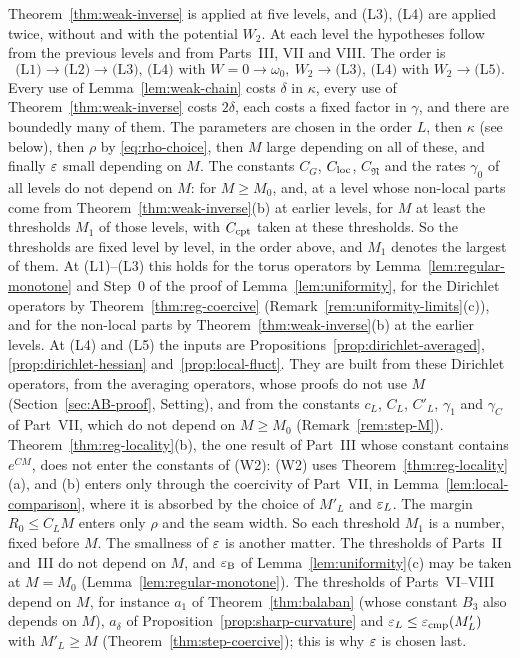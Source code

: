 Theorem~\ref{thm:weak-inverse} is applied at five levels, and (L3), (L4) are applied twice, without and with the potential $W_2$. At each level the hypotheses follow from the previous levels and from Parts~III, VII and VIII. The order is
\[
\text{(L1)}\to\text{(L2)}\to\text{(L3), (L4) with }W=0\to\omega_0,\ W_2\to\text{(L3), (L4) with }W_2\to\text{(L5)}.
\]
Every use of Lemma~\ref{lem:weak-chain} costs $\delta$ in $\kappa$, every use of Theorem~\ref{thm:weak-inverse} costs $2\delta$, each costs a fixed factor in $\gamma$, and there are boundedly many of them. The parameters are chosen in the order $L$, then $\kappa$ (see below), then $\rho$ by \eqref{eq:rho-choice}, then $M$ large depending on all of these, and finally $\varepsilon$ small depending on $M$. The constants $C_G$, $C_{\rm loc}$, $C_{\mathfrak N}$ and the rates $\gamma_0$ of all levels do not depend on $M$: for $M\ge M_0$, and, at a level whose non-local parts come from Theorem~\ref{thm:weak-inverse}(b) at earlier levels, for $M$ at least the thresholds $M_1$ of those levels, with $C_{\rm cpt}$ taken at these thresholds. So the thresholds are fixed level by level, in the order above, and $M_1$ denotes the largest of them. At (L1)--(L3) this holds for the torus operators by Lemma~\ref{lem:regular-monotone} and Step~0 of the proof of Lemma~\ref{lem:uniformity}, for the Dirichlet operators by Theorem~\ref{thm:reg-coercive} (Remark~\ref{rem:uniformity-limits}(c)), and for the non-local parts by Theorem~\ref{thm:weak-inverse}(b) at the earlier levels. At (L4) and (L5) the inputs are Propositions~\ref{prop:dirichlet-averaged}, \ref{prop:dirichlet-hessian} and~\ref{prop:local-fluct}. They are built from these Dirichlet operators, from the averaging operators, whose proofs do not use $M$ (Section~\ref{sec:AB-proof}, Setting), and from the constants $c_L$, $C_L$, $C'_L$, $\gamma_1$ and $\gamma_C$ of Part~VII, which do not depend on $M\ge M_0$ (Remark~\ref{rem:step-M}). Theorem~\ref{thm:reg-locality}(b), the one result of Part~III whose constant contains $e^{CM}$, does not enter the constants of (W2): (W2) uses Theorem~\ref{thm:reg-locality}(a), and (b) enters only through the coercivity of Part~VII, in Lemma~\ref{lem:local-comparison}, where it is absorbed by the choice of $M'_L$ and $\varepsilon_L$. The margin $R_0\le C_LM$ enters only $\rho$ and the seam width. So each threshold $M_1$ is a number, fixed before $M$. The smallness of $\varepsilon$ is another matter. The thresholds of Parts~II and~III do not depend on $M$, and $\varepsilon_{\rm B}$ of Lemma~\ref{lem:uniformity}(c) may be taken at $M=M_0$ (Lemma~\ref{lem:regular-monotone}). The thresholds of Parts~VI--VIII depend on $M$, for instance $a_1$ of Theorem~\ref{thm:balaban} (whose constant $B_3$ also depends on $M$), $a_\delta$ of Proposition~\ref{prop:sharp-curvature} and $\varepsilon_L\le\varepsilon_{\rm cmp}(M'_L)$ with $M'_L\ge M$ (Theorem~\ref{thm:step-coercive}); this is why $\varepsilon$ is chosen last.


